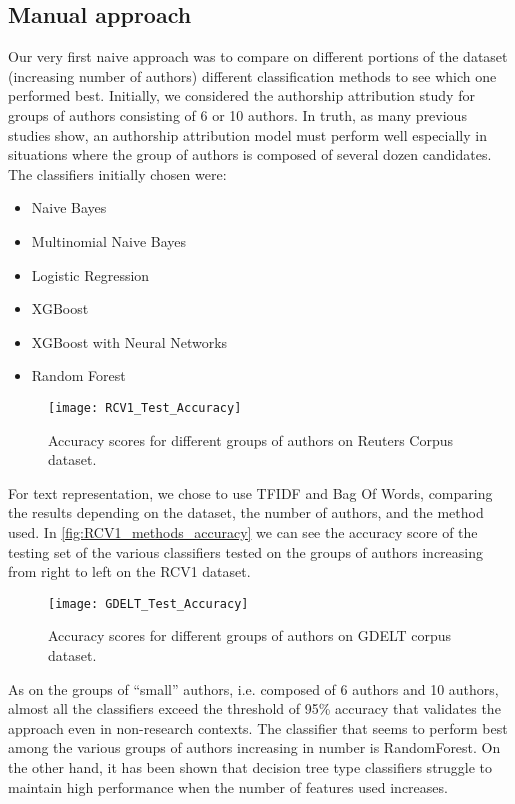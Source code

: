 \subsection{Manual approach}
Our very first naive approach was to compare on different portions of the dataset (increasing number of authors) different classification methods to see which one performed best.
Initially, we considered the authorship attribution study for groups of authors consisting of 6 or 10 authors. In truth, as many previous studies show, an authorship attribution model must perform well especially in situations where the group of authors is composed of several dozen candidates.
The classifiers initially chosen were:
\begin{itemize}
	\item Naive Bayes
	\item Multinomial Naive Bayes
	\item Logistic Regression
	\item XGBoost
	\item XGBoost with Neural Networks
	\item Random Forest
\end{itemize}

\begin{figure}[ht]
	\centering
	\texttt{[image: RCV1\_Test\_Accuracy]}
	\caption[Methods performance on Reuters Corpus]{Accuracy scores for different groups of authors on Reuters Corpus dataset.}
	\label{fig:RCV1_methods_accuracy}
\end{figure}

For text representation, we chose to use TFIDF and Bag Of Words, comparing the results depending on the dataset, the number of authors, and the method used.
In \autoref{fig:RCV1_methods_accuracy} we can see the accuracy score of the testing set of the various classifiers tested on the groups of authors increasing from right to left on the RCV1 dataset.

\begin{figure}[ht]
	\centering
	\texttt{[image: GDELT\_Test\_Accuracy]}
	\caption[Methods performance on GDELT corpus]{Accuracy scores for different groups of authors on GDELT corpus dataset.}
	\label{fig:GDELT_methods_accuracy}
\end{figure}

As on the groups of \enquote{small} authors, i.e. composed of 6 authors and 10 authors, almost all the classifiers exceed the threshold of 95\% accuracy that validates the approach even in non-research contexts. The classifier that seems to perform best among the various groups of authors increasing in number is RandomForest. On the other hand, it has been shown that decision tree type classifiers struggle to maintain high performance when the number of features used increases.

